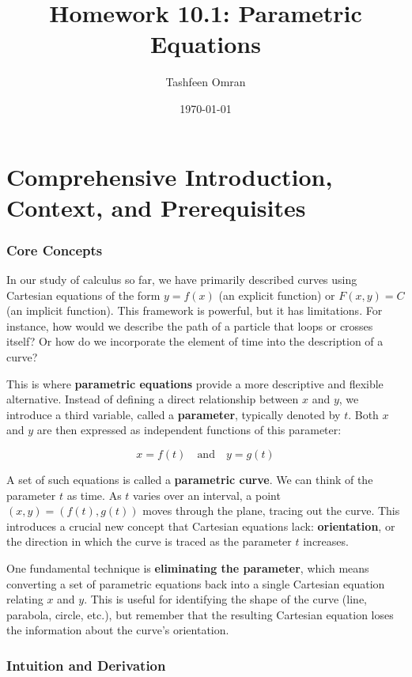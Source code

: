 \documentclass{article}
\title{Homework 10.1: Parametric Equations}
\author{Tashfeen Omran}
\date{\today}
\begin{document}
\maketitle

\part*{Comprehensive Introduction, Context, and Prerequisites}

\section{Core Concepts}

In our study of calculus so far, we have primarily described curves using Cartesian equations of the form $y = f(x)$ (an explicit function) or $F(x, y) = C$ (an implicit function). This framework is powerful, but it has limitations. For instance, how would we describe the path of a particle that loops or crosses itself? Or how do we incorporate the element of time into the description of a curve?

This is where \textbf{parametric equations} provide a more descriptive and flexible alternative. Instead of defining a direct relationship between $x$ and $y$, we introduce a third variable, called a \textbf{parameter}, typically denoted by $t$. Both $x$ and $y$ are then expressed as independent functions of this parameter:

\[
x = f(t) \quad \text{and} \quad y = g(t)
\]

A set of such equations is called a \textbf{parametric curve}. We can think of the parameter $t$ as time. As $t$ varies over an interval, a point $(x, y) = (f(t), g(t))$ moves through the plane, tracing out the curve. This introduces a crucial new concept that Cartesian equations lack: \textbf{orientation}, or the direction in which the curve is traced as the parameter $t$ increases.

One fundamental technique is \textbf{eliminating the parameter}, which means converting a set of parametric equations back into a single Cartesian equation relating $x$ and $y$. This is useful for identifying the shape of the curve (line, parabola, circle, etc.), but remember that the resulting Cartesian equation loses the information about the curve's orientation.

\section{Intuition and Derivation}
\end{document}
